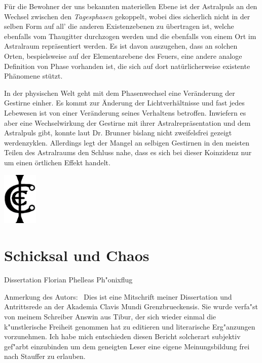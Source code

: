 \documentclass[a5paper,8pt]{book}
\begin{document}
\begin{multicols}{2}
Für die Bewohner der uns bekannten materiellen Ebene ist der Astralpuls an den Wechsel zwischen den \textit{Tagesphasen}
gekoppelt, wobei dies sicherlich nicht in der selben Form auf all' die anderen Existenzebenen zu übertragen ist,
welche ebenfalls vom Thaugitter durchzogen werden und die ebenfalls von einem Ort im Astralraum repräsentiert werden. Es
ist davon auszugehen, dass an solchen Orten, bespielsweise auf der Elementarebene des Feuers, eine andere analoge
Definition von Phase vorhanden ist, die sich auf dort natürlicherweise existente Phänomene stützt. 

In der physischen Welt geht mit dem Phasenwechsel eine Veränderung der Gestirne einher. Es kommt zur Änderung der
Lichtverhältnisse und fast jedes Lebewesen ist von einer Veränderung seines Verhaltens betroffen. Inwiefern es aber
eine Wechselwirkung der Gestirne mit ihrer Astralrepräsentation und dem Astralpuls gibt, konnte laut Dr.
Brunner bislang nicht zweifelsfrei gezeigt werdenzyklen. Allerdings legt der Mangel an selbigen Gestirnen in den meisten
Teilen des Astralraums den Schluss nahe, dass es sich bei dieser Koinzidenz nur um einen örtlichen Effekt handelt.

\end{multicols}

\begin{flushright}
\includegraphics[height=1in]{pictures/Cordo_Siegel.png}
\end{flushright}

\newpage

\section{Schicksal und Chaos}

Dissertation Florian Phelleas Ph"onixflug

Anmerkung des Autors:\
Dies ist eine Mitschrift meiner Dissertation und Antrittsrede an der Akademia Clavis Mundi Grenzbrueckensis. Sie wurde verfa"st von 
meinem Schreiber Answin aus Tibur, der sich wieder einmal die k"unstlerische Freiheit genommen hat zu editieren und literarische 
Erg"anzungen vorzunehmen. Ich habe mich entschieden diesen Bericht solcherart subjektiv gef"arbt einzubinden um dem geneigten Leser 
eine eigene Meinungsbildung frei nach Stauffer zu erlauben.
\end{document}
